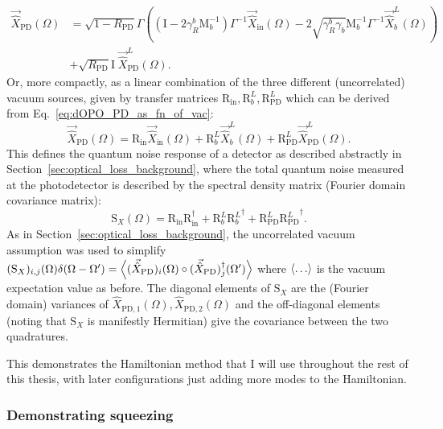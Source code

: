 \begin{align}
\label{eq:dOPO_PD_as_fn_of_vac}
\vec{\hat X}_\mathrm{PD}(\Omega)&=\sqrt{1-R_\text{PD}}\Gamma\left(\left(\text{I}-2\gamma^b_R\text{M}_b^{-1}\right)\Gamma^{-1}\vec{\hat X}_\mathrm{in}(\Omega)-2\sqrt{\gamma^b_R \gamma_b}\text{M}_b^{-1}\Gamma^{-1}\vec{\hat X}^L_b(\Omega)\right)\\
&+\sqrt{R_\text{PD}}\text{I}\;\vec{\hat X}^L_\text{PD}(\Omega).\nonumber
\end{align}
Or, more compactly, as a linear combination of the three different (uncorrelated) vacuum sources, given by transfer matrices $\text{R}_\text{in},\text{R}^L_b, \text{R}^L_\text{PD}$ which can be derived from Eq.~\ref{eq:dOPO_PD_as_fn_of_vac}: \begin{equation}\vec{\hat X}_\mathrm{PD}(\Omega)=\text{R}_\text{in}\vec{\hat X}_\mathrm{in}(\Omega)+\text{R}^L_b\vec{\hat X}^L_b(\Omega)+\text{R}^L_\text{PD}\vec{\hat X}^L_\text{PD}(\Omega).\end{equation} This defines the quantum noise response of a detector as described abstractly in Section~\ref{sec:optical_loss_background}, where the total quantum noise measured at the photodetector is described by the spectral density matrix (Fourier domain covariance matrix): \begin{equation}\label{eq:dOPO_Sx_abstract}\text{S}_X(\Omega)=\text{R}_\text{in} \text{R}_\text{in}^\dag+\text{R}^L_b {\text{R}^L_b}^\dag+\text{R}^L_\text{PD}{\text{R}^L_\text{PD}}^\dag.\end{equation} As in Section~\ref{sec:optical_loss_background}, the uncorrelated vacuum assumption was used to simplify $(\text{S}_X)_{i,j}(\Omega)\delta(\Omega-\Omega')=\ev{(\vec{\hat X}_\text{PD})_i(\Omega)\circ(\vec{\hat X}_\text{PD})_j^\dag(\Omega')}$ where $\ev{\ldots}$ is the vacuum expectation value as before. The diagonal elements of $\text{S}_X$ are the (Fourier domain) variances of ${\hat X}_{\mathrm{PD},1}(\Omega), {\hat X}_{\mathrm{PD},2}(\Omega)$ and the off-diagonal elements (noting that $\text{S}_X$ is manifestly Hermitian) give the covariance between the two quadratures.

This demonstrates the Hamiltonian method that I will use throughout the rest of this thesis, with later configurations just adding more modes to the Hamiltonian. %

\subsubsection{Demonstrating squeezing}

